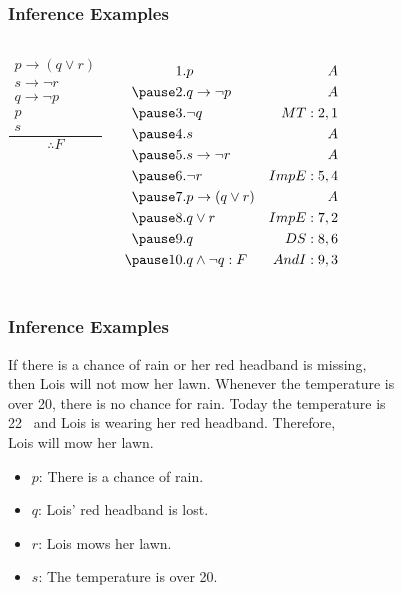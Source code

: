 \documentclass[dvipsnames]{beamer}
\begin{document}
\begin{frame}
  \frametitle{Inference Examples}

  \begin{columns}
    \[
    \frac
      {
        \begin{array}{c}
          p \rightarrow (q \vee r)\\
          s \rightarrow \neg r\\
          q \rightarrow \neg p\\
          p\\
          s
        \end{array}
      }
      {
        \therefore F
      }
    \]

    \pause
    \begin{eqnarray*}
      1. & p                        & A\\
      \pause
      2. & q \rightarrow \neg p     & A\\
      \pause
      3. & \neg q                   & MT:2,1\\
      \pause
      4. & s                        & A\\
      \pause
      5. & s \rightarrow \neg r     & A\\
      \pause
      6. & \neg r                   & ImpE:5,4\\
      \pause
      7. & p \rightarrow (q \vee r) & A\\
      \pause
      8. & q \vee r                 & ImpE:7,2\\
      \pause
      9. & q                        & DS:8,6\\
      \pause
      10. & q \wedge \neg q : F      & AndI:9,3
    \end{eqnarray*}
  \end{columns}
\end{frame}

\begin{frame}
  \frametitle{Inference Examples}

  If there is a chance of rain or her red headband is missing,\\
  then Lois will not mow her lawn. Whenever the temperature is\\
  over 20\textcelsius, there is no chance for rain. Today the temperature is\\
  22\textcelsius ~ and Lois is wearing her red headband. Therefore,\\
  Lois will mow her lawn.

  \pause
  \medskip
  \begin{itemize}
    \item $p$: There is a chance of rain.
    \item $q$: Lois' red headband is lost.
    \item $r$: Lois mows her lawn.
    \item $s$: The temperature is over 20\textcelsius.
  \end{itemize}
\end{frame}
\end{document}

